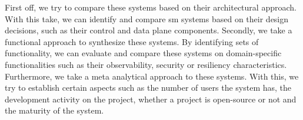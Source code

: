 First off, we try to compare these systems based on their architectural approach. With this take, we can identify and compare \gls{sm} systems based on their design decisions, such as their control and data plane components. Secondly, we take a functional approach to synthesize these systems. By identifying sets of functionality, we can evaluate and compare these systems on domain-specific functionalities such as their observability, security or resiliency characteristics. Furthermore, we take a meta analytical approach to these systems. With this, we try to establish certain aspects such as the number of users the system has, the development activity on the project, whether a project is open-source or not and the maturity of the system.